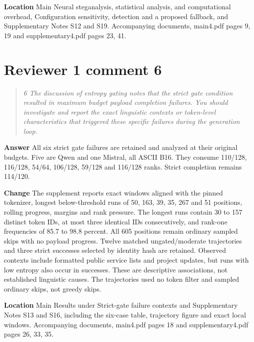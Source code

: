 \documentclass[11pt]{article}
\newenvironment{reviewcomment}{\begin{quote}\color{commentgray}\itshape}{\end{quote}}
\begin{document}
\textbf{Location} Main Neural steganalysis, statistical analysis, and computational overhead, Configuration sensitivity, detection and a proposed fallback, and Supplementary Notes S12 and S19. Accompanying documents, main4.pdf pages 9, 19 and supplementary4.pdf pages 23, 41.


\section*{Reviewer 1 comment 6}\label{resp:R1-6}
\begin{reviewcomment}
6 The discussion of entropy gating notes that the strict gate condition resulted in maximum budget payload completion failures. You should investigate and report the exact linguistic contexts or token-level characteristics that triggered these specific failures during the generation loop.
\end{reviewcomment}

\textbf{Answer} All six strict gate failures are retained and analyzed at their original budgets. Five are Qwen and one Mistral, all ASCII B16. They consume 110/128, 116/128, 54/64, 106/128, 59/128 and 116/128 ranks. Strict completion remains 114/120.

\textbf{Change} The supplement reports exact windows aligned with the pinned tokenizer, longest below-threshold runs of 50, 163, 39, 35, 267 and 51 positions, rolling progress, margins and rank pressure. The longest runs contain 30 to 157 distinct token IDs, at most three identical IDs consecutively, and rank-one frequencies of 85.7 to 98.8 percent. All 605 positions remain ordinary sampled skips with no payload progress. Twelve matched ungated/moderate trajectories and three strict successes selected by identity hash are retained. Observed contexts include formatted public service lists and project updates, but runs with low entropy also occur in successes. These are descriptive associations, not established linguistic causes. The trajectories used no token filter and sampled ordinary skips, not greedy skips.

\textbf{Location} Main Results under Strict-gate failure contexts and Supplementary Notes S13 and S16, including the six-case table, trajectory figure and exact local windows. Accompanying documents, main4.pdf pages 18 and supplementary4.pdf pages 26, 33, 35.

\end{document}
